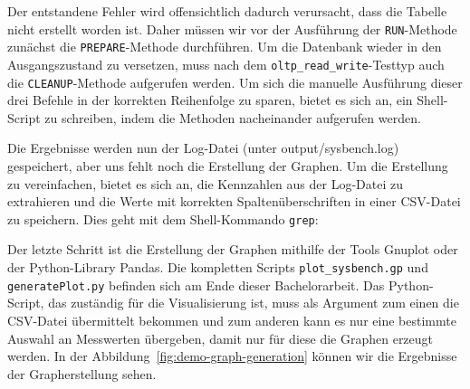 Der entstandene Fehler wird offensichtlich dadurch verursacht, dass die Tabelle nicht erstellt worden ist.
Daher müssen wir vor der Ausführung der \texttt{RUN}-Methode zunächst die \texttt{PREPARE}-Methode durchführen.
Um die Datenbank wieder in den Ausgangszustand zu versetzen, muss nach dem \texttt{oltp\_read\_write}-Testtyp auch die \texttt{CLEANUP}-Methode aufgerufen werden.
Um sich die manuelle Ausführung dieser drei Befehle in der korrekten Reihenfolge zu sparen, bietet es sich an, ein Shell-Script zu schreiben, indem die Methoden nacheinander aufgerufen werden.

\vspace{-5pt}

\vspace{-5pt}

Die Ergebnisse werden nun der Log-Datei (unter output/sysbench.log) gespeichert, aber uns fehlt noch die Erstellung der Graphen.
Um die Erstellung zu vereinfachen, bietet es sich an, die Kennzahlen aus der Log-Datei zu extrahieren und die Werte mit korrekten Spaltenüberschriften in einer CSV-Datei zu speichern.
Dies geht mit dem Shell-Kommando \texttt{grep}:

\vspace{-5pt}

\vspace{-5pt}

Der letzte Schritt ist die Erstellung der Graphen mithilfe der Tools Gnuplot oder der Python-Library Pandas.
Die kompletten Scripts \texttt{plot\_sysbench.gp} und \texttt{generatePlot.py} befinden sich am Ende dieser Bachelorarbeit.
Das Python-Script, das zuständig für die Visualisierung ist, muss als Argument zum einen die CSV-Datei übermittelt bekommen und zum anderen kann es nur eine bestimmte Auswahl an Messwerten übergeben, damit nur für diese die Graphen erzeugt werden.
In der Abbildung~\ref{fig:demo-graph-generation} können wir die Ergebnisse der Grapherstellung sehen.

\vspace{-5pt}

\vspace{-5pt}

